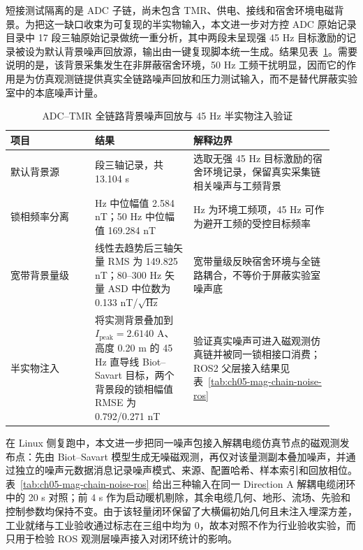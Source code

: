 短接测试隔离的是 ADC 子链，尚未包含 TMR、供电、接线和宿舍环境电磁背景。为把这一缺口收束为可复现的半实物输入，本文进一步对方控 ADC 原始记录目录中 17 段三轴原始记录做统一重分析，其中两段未呈现强 45 Hz 目标激励的记录被设为默认背景噪声回放源，输出由一键复现脚本统一生成。结果见表~\ref{tab:ch05-mag-chain-noise-replay}。需要说明的是，该背景采集发生在非屏蔽宿舍环境，50 Hz 工频干扰明显，因而它的作用是为仿真观测链提供真实全链路噪声回放和压力测试输入，而不是替代屏蔽实验室中的本底噪声计量。

\begin{table}[htbp]
\centering
\small
\setlength{\tabcolsep}{4pt}
\caption{ADC--TMR 全链路背景噪声回放与 45 Hz 半实物注入验证}\label{tab:ch05-mag-chain-noise-replay}
\begin{tabular}{@{}>{\raggedright\arraybackslash}p{0.24\linewidth}>{\raggedright\arraybackslash}p{0.28\linewidth}>{\raggedright\arraybackslash}p{0.40\linewidth}@{}}
\toprule
项目 & 结果 & 解释边界 \\
\midrule
默认背景源 & 2 段三轴记录，共 13.104 s & 选取无强 45 Hz 目标激励的宿舍环境记录，保留真实采集链相关噪声与工频背景 \\
锁相频率分离 & 45 Hz 中位幅值 2.584 nT；50 Hz 中位幅值 169.284 nT & 50 Hz 为环境工频项，45 Hz 可作为避开工频的受控目标频率 \\
宽带背景量级 & 线性去趋势后三轴矢量 RMS 为 149.825 nT；80--300 Hz 矢量 ASD 中位数为 0.133 nT/\(\sqrt{\text{Hz}}\) & 宽带量级反映宿舍环境与全链路耦合，不等价于屏蔽实验室噪声底 \\
半实物注入 & 将实测背景叠加到 \(I_{\mathrm{peak}}=2.6140\text{ A}\)、高度 0.20 m 的 45 Hz 直导线 Biot--Savart 目标，两个背景段的锁相幅值 RMSE 为 0.792/0.271 nT & 验证真实噪声可进入磁观测仿真链并被同一锁相接口消费；ROS2 父层接入结果见表~\ref{tab:ch05-mag-chain-noise-ros} \\
\bottomrule
\end{tabular}
\end{table}
\FloatBarrier

在 Linux 侧复跑中，本文进一步把同一噪声包接入解耦电缆仿真节点的磁观测发布点：先由 Biot--Savart 模型生成无噪磁观测，再仅对该量测副本叠加噪声，并通过独立的噪声元数据消息记录噪声模式、来源、配置哈希、样本索引和回放相位。表~\ref{tab:ch05-mag-chain-noise-ros} 给出三种输入在同一 Direction A 解耦电缆闭环中的 20 s 对照；前 4 s 作为启动暖机剔除，其余电缆几何、地形、流场、先验和控制参数均保持不变。由于该轻量闭环保留了大横偏初始几何且未注入埋深方差，工业就绪与工业验收通过标志在三组中均为 0，故本对照不作为行业验收实验，而只用于检验 ROS 观测层噪声接入对闭环统计的影响。

